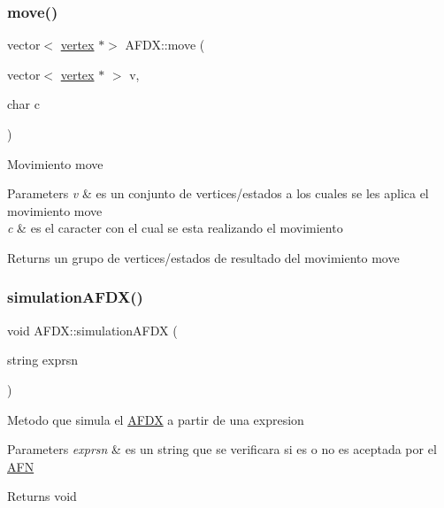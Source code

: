 \subsubsection{\texorpdfstring{move()}{move()}}
{\footnotesize\ttfamily vector$<$ \hyperlink{structvertex}{vertex} $\ast$$>$ A\+F\+D\+X\+::move (\begin{DoxyParamCaption}\item[{vector$<$ \hyperlink{structvertex}{vertex} $\ast$ $>$}]{v,  }\item[{char}]{c }\end{DoxyParamCaption})}

Movimiento move 
\begin{DoxyParams}{Parameters}
{\em v} & es un conjunto de vertices/estados a los cuales se les aplica el movimiento move \\
\hline
{\em c} & es el caracter con el cual se esta realizando el movimiento \\
\hline
\end{DoxyParams}
\begin{DoxyReturn}{Returns}
un grupo de vertices/estados de resultado del movimiento move 
\end{DoxyReturn}
\hypertarget{class_a_f_d_x_ae47ecdcac8ec88b22d88fa1bfa52f781}{}\label{class_a_f_d_x_ae47ecdcac8ec88b22d88fa1bfa52f781} 
\subsubsection{\texorpdfstring{simulation\+A\+F\+D\+X()}{simulationAFDX()}}
{\footnotesize\ttfamily void A\+F\+D\+X\+::simulation\+A\+F\+DX (\begin{DoxyParamCaption}\item[{string}]{exprsn }\end{DoxyParamCaption})}

Metodo que simula el \hyperlink{class_a_f_d_x}{A\+F\+DX} a partir de una expresion 
\begin{DoxyParams}{Parameters}
{\em exprsn} & es un string que se verificara si es o no es aceptada por el \hyperlink{class_a_f_n}{A\+FN} \\
\hline
\end{DoxyParams}
\begin{DoxyReturn}{Returns}
void 
\end{DoxyReturn}
\hypertarget{class_a_f_d_x_a1fa780c283bf7bafbc63c25102f9ae69}{}\label{class_a_f_d_x_a1fa780c283bf7bafbc63c25102f9ae69} 

